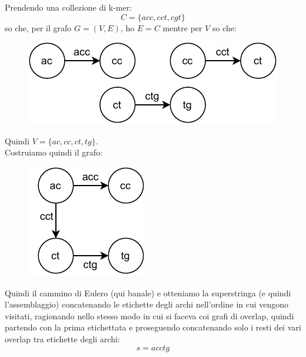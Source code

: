 \documentclass[a4paper,12pt, oneside]{book}
\begin{document}
\begin{esempio}
  Prendendo una collezione di k-mer:
  \[C=\{acc,cct,cgt\}\]
  so che, per il grafo $G=(V,E)$, ho $E=C$ mentre per $V$ so che:
  \begin{figure}[H]
    \centering
    \includegraphics[scale = 1]{img/gra5.pdf}
  \end{figure}
  Quindi $V=\{ac,cc,ct,tg\}$.\\
  Costruiamo quindi il grafo:
  \begin{figure}[H]
    \centering
    \includegraphics[scale = 1]{img/gra6.pdf}
  \end{figure}
  Quindi il cammino di Eulero (qui banale) e otteniamo la superstringa (e quindi
  l'assemblaggio)
  concatenando le etichette degli archi nell'ordine in cui vengono visitati,
  ragionando nello stesso modo in cui si faceva coi grafi di overlap, quindi
  partendo con la prima etichettata e proseguendo concatenando solo i resti dei
  vari overlap tra etichette degli archi:
  \[s=acctg\]
\end{esempio}
\end{document}
